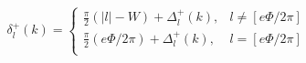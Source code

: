 \begin{equation}
\label{Eq_0223}
\delta^{+}_l(k) =
\begin{cases}
\displaystyle
\frac{\pi}{2}(|l| - W) + \Delta^{+}_l(k),& l \neq [e\Phi/2\pi]\\[5mm]
\displaystyle
\frac{\pi}{2}(e\Phi/2\pi) + \Delta^{+}_l(k),& l = [e\Phi/2\pi]\\
\end{cases}
\end{equation}

